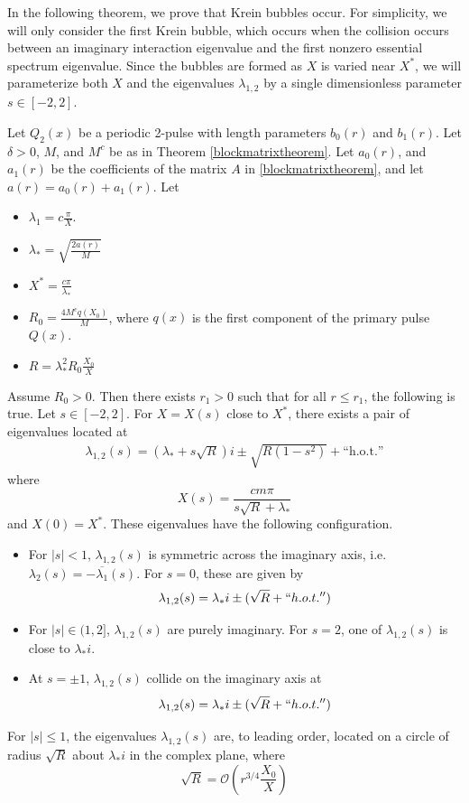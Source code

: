 \documentclass[thesis.tex]{subfiles}
\begin{document}
In the following theorem, we prove that Krein bubbles occur. For simplicity, we will only consider the first Krein bubble, which occurs when the collision occurs between an imaginary interaction eigenvalue and the first nonzero essential spectrum eigenvalue. Since the bubbles are formed as $X$ is varied near $X^*$, we will parameterize both $X$ and the eigenvalues $\lambda_{1,2}$ by a single dimensionless parameter $s \in [-2, 2]$. 

\begin{theorem}\label{theorem:kreinbubbles}
Let $Q_2(x)$ be a periodic 2-pulse with length parameters $b_0(r)$ and $b_1(r)$. Let $\delta > 0$, $M$, and $M^c$ be as in Theorem \ref{blockmatrixtheorem}. Let $a_0(r)$, and $a_1(r)$ be the coefficients of the matrix $A$ in \ref{blockmatrixtheorem}, and let $a(r) = a_0(r) + a_1(r)$. Let
\begin{itemize}
\item $\lambda_1 = c \frac{\pi}{X}$.
\item $\lambda_* = \sqrt{\frac{2 a(r) }{M}}$
\item $X^* = \frac{c \pi}{\lambda_*}$
\item $R_0 = \frac{4 M^c q(X_0)}{M}$, where $q(x)$ is the first component of the primary pulse $Q(x)$.
\item $R = \lambda_*^2 R_0 \frac{X_0}{X}$
\end{itemize}

Assume $R_0 > 0$. Then there exists $r_1 > 0$ such that for all $r \leq r_1$, the following is true. Let $s \in [-2, 2]$. For $X = X(s)$ close to $X^*$, there exists a pair of eigenvalues located at
\begin{align*}
\lambda_{1,2}(s) = \left( \lambda_* + s \sqrt{R} \right) i \pm \sqrt{R(1 - s^2)} + \text{``h.o.t.''}
\end{align*}
where
\[
X(s) = \frac{c m \pi}{s \sqrt{R} + \lambda_*}
\]
and $X(0) = X^*$. These eigenvalues have the following configuration.
\begin{itemize}
\item For $|s| < 1$, $\lambda_{1,2}(s)$ is symmetric across the imaginary axis, i.e. $\lambda_2(s) = -\overline{\lambda_1}(s)$. For $s = 0$, these are given by
\[
\lambda_{1,2}(s) = \lambda_* i \pm (\sqrt{R} + ``h.o.t.'')
\]
\item For $|s| \in (1, 2]$, $\lambda_{1,2}(s)$
are purely imaginary. For $s = 2$, one of $\lambda_{1,2}(s)$ is close to $\lambda_* i$.
\item At $s = \pm 1$, $\lambda_{1,2}(s)$ collide on the imaginary axis at 
\[
\lambda_{1,2}(s) = \lambda_* i \pm (\sqrt{R} + ``h.o.t.'')
\]
\end{itemize}
For $|s| \leq 1$, the eigenvalues $\lambda_{1,2}(s)$ are, to leading order, located on a circle of radius $\sqrt{R}$ about $\lambda_* i$ in the complex plane, where
\[
\sqrt{R} = \mathcal{O}\left( r^{3/4}\frac{X_0}{X} \right)
\]
\end{theorem}
\end{document}
